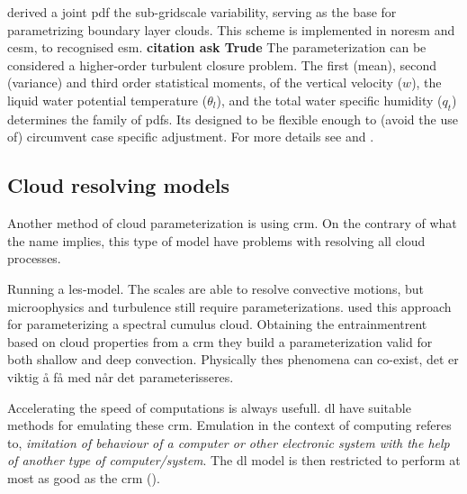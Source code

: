 \cite{Golaz2002_part1} derived a joint \acrshort{pdf} the sub-gridscale variability, serving as the base for parametrizing boundary layer clouds. This scheme is implemented in \acrfull{noresm} and \acrfull{cesm}, to recognised \acrshort{esm}. \textbf{citation ask Trude} The parameterization can be considered a higher-order turbulent closure problem. The first (mean), second (variance) and third order statistical moments, of the vertical velocity ($w$), the liquid water potential temperature ($\theta_l$), and the total water specific humidity ($q_t$) determines the family of \acrshort{pdf}s. Its designed to be flexible enough to (avoid the use of) circumvent case specific adjustment. For more details see \cite{Golaz2002_part1} and \cite{Golaz2002_part2}.

\subsection{Cloud resolving models} \label{sec:params_climate_models}
Another method of cloud parameterization is using \acrshort{crm}. On the contrary of what the name implies, this type of model have problems with resolving all cloud processes. 

Running a \acrfull{les}-model. The scales are able to resolve convective motions, but microophysics and turbulence still require parameterizations. \cite{Baba2019SpectralModel} used this approach for parameterizing a spectral cumulus cloud. Obtaining the entrainmentrent based on cloud properties from a \acrshort{crm} they build a parameterization valid for both shallow and deep convection. Physically thes phenomena can co-exist, det er viktig å få med når det parameterisseres. 

Accelerating the speed of computations is always usefull. \acrshort{dl} have suitable methods for emulating these \acrshort{crm}. Emulation in the context of computing referes to, \textit{imitation of behaviour of a computer or other electronic system with the help of another type of computer/system}. The \acrshort{dl} model is then restricted to perform at most as good as the \acrshort{crm} (\cite{Rasp2018DeepModels}).